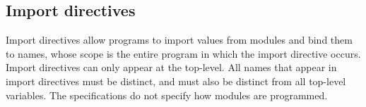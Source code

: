 \subsection*{Import directives}

Import directives allow programs to import values from modules and bind them to names, whose scope
is the entire program in which the import directive occurs.  Import directives can only appear at the top-level.  All names that appear in import directives
must be distinct, and must also be distinct from all top-level variables.  The specifications do not specify how modules are
programmed.
